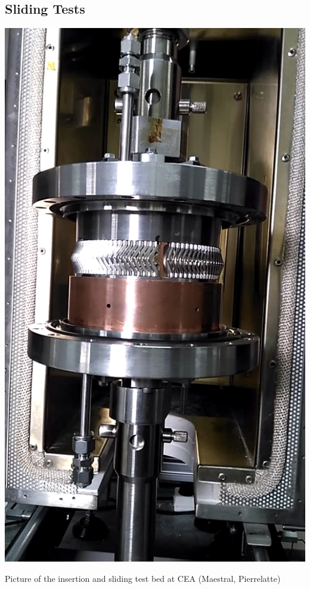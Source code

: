 {\subsection{Sliding Tests}
\begin{marginfigure}
	\centering
	\includegraphics[width=1.0\linewidth]{figures/chap3/RF_contacts/RF_contact_LACUT_sliding_tests}
	\caption{Picture of the insertion and sliding test bed at CEA (Maestral, Pierrelatte)}
	\label{fig:rfcontactlacutslidingtests}
\end{marginfigure}

}
